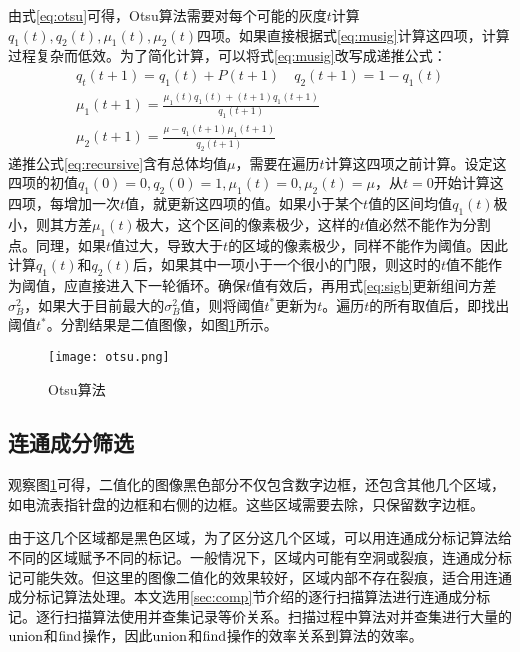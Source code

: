 由式\eqref{eq:otsu}可得，Otsu算法需要对每个可能的灰度$t$计算$q_1(t),q_2(t),\mu_1(t),\mu_2(t)$四项。如果直接根据式\eqref{eq:musig}计算这四项，计算过程复杂而低效。为了简化计算，可以将式\eqref{eq:musig}改写成递推公式：
\begin{equation}
  \label{eq:recursive}
  \begin{aligned}
    q_t(t+1)=q_1(t)+P(t+1)\quad q_2(t+1)=1-q_1(t) \\
    \mu_1(t+1)=\frac{\mu_1(t)q_1(t)+(t+1)q_1(t+1)}{q_1(t+1)} \\
    \mu_2(t+1)=\frac{\mu-q_1(t+1)\mu_1(t+1)}{q_2(t+1)}
  \end{aligned}
\end{equation}
递推公式\eqref{eq:recursive}含有总体均值$\mu$，需要在遍历$t$计算这四项之前计算。设定这四项的初值$q_1(0)=0,q_2(0)=1,\mu_1(t)=0,\mu_2(t)=\mu$，从$t=0$开始计算这四项，每增加一次$t$值，就更新这四项的值。如果小于某个$t$值的区间均值$q_1(t)$极小，则其方差$\mu_1(t)$极大，这个区间的像素极少，这样的$t$值必然不能作为分割点。同理，如果$t$值过大，导致大于$t$的区域的像素极少，同样不能作为阈值。因此计算$q_1(t)$和$q_2(t)$后，如果其中一项小于一个很小的门限，则这时的$t$值不能作为阈值，应直接进入下一轮循环。确保$t$值有效后，再用式\eqref{eq:sigb}更新组间方差$\sigma_B^2$，如果大于目前最大的$\sigma_B^2$值，则将阈值$t^{*}$更新为$t$。遍历$t$的所有取值后，即找出阈值$t^{*}$。分割结果是二值图像，如图\ref{fig:otsu}所示。

\begin{figure}[h]
  \centering
  \texttt{[image: otsu.png]}
  \caption{Otsu算法}
  \label{fig:otsu}
\end{figure}

\subsection{连通成分筛选}

观察图\ref{fig:otsu}可得，二值化的图像黑色部分不仅包含数字边框，还包含其他几个区域，如电流表指针盘的边框和右侧的边框。这些区域需要去除，只保留数字边框。


由于这几个区域都是黑色区域，为了区分这几个区域，可以用连通成分标记算法给不同的区域赋予不同的标记。一般情况下，区域内可能有空洞或裂痕，连通成分标记可能失效。但这里的图像二值化的效果较好，区域内部不存在裂痕，适合用连通成分标记算法处理。本文选用\ref{sec:comp}节介绍的逐行扫描算法进行连通成分标记。逐行扫描算法使用并查集记录等价关系。扫描过程中算法对并查集进行大量的$\operatorname{union}$和$\operatorname{find}$操作，因此$\operatorname{union}$和$\operatorname{find}$操作的效率关系到算法的效率。

